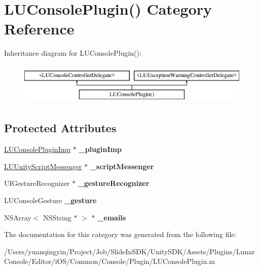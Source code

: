 \hypertarget{category_l_u_console_plugin_07_08}{}\section{L\+U\+Console\+Plugin() Category Reference}
\label{category_l_u_console_plugin_07_08}
Inheritance diagram for L\+U\+Console\+Plugin()\+:\begin{figure}[H]
\begin{center}
\leavevmode
\includegraphics[height=2.000000cm]{category_l_u_console_plugin_07_08}
\end{center}
\end{figure}
\subsection*{Protected Attributes}
\begin{DoxyCompactItemize}
\item 
\mbox{\label{category_l_u_console_plugin_07_08_a93d0f603de22d96de2f8c43b790247cc}} 
\mbox{\hyperlink{interface_l_u_console_plugin_imp}{L\+U\+Console\+Plugin\+Imp}} $\ast$ {\bfseries \+\_\+plugin\+Imp}
\item 
\mbox{\label{category_l_u_console_plugin_07_08_ac616be63cd80278e6a9166406ce576b8}} 
\mbox{\hyperlink{interface_l_u_unity_script_messenger}{L\+U\+Unity\+Script\+Messenger}} $\ast$ {\bfseries \+\_\+script\+Messenger}
\item 
\mbox{\label{category_l_u_console_plugin_07_08_ae8bb4a0d48163a128d402c04a4554b5a}} 
U\+I\+Gesture\+Recognizer $\ast$ {\bfseries \+\_\+gesture\+Recognizer}
\item 
\mbox{\label{category_l_u_console_plugin_07_08_a316d73af32a467a0ff645a488ec44b2f}} 
L\+U\+Console\+Gesture {\bfseries \+\_\+gesture}
\item 
\mbox{\label{category_l_u_console_plugin_07_08_aa74c8abc782fd421ce4cb229ff292611}} 
N\+S\+Array$<$ N\+S\+String $\ast$ $>$ $\ast$ {\bfseries \+\_\+emails}
\end{DoxyCompactItemize}


The documentation for this category was generated from the following file\+:\begin{DoxyCompactItemize}
\item 
/\+Users/yuanqingyin/\+Project/\+Job/\+Slide\+In\+S\+D\+K/\+Unity\+S\+D\+K/\+Assets/\+Plugins/\+Lunar\+Console/\+Editor/i\+O\+S/\+Common/\+Console/\+Plugin/L\+U\+Console\+Plugin.\+m\end{DoxyCompactItemize}
